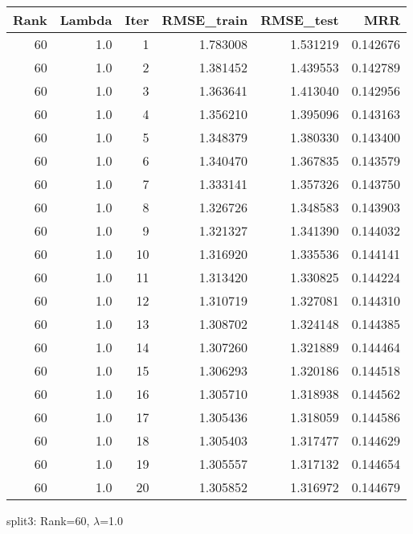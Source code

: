 \begin{tabular}{rrrrrr}
\toprule
 Rank &  Lambda &  Iter &  RMSE\_train &  RMSE\_test &       MRR \\
\midrule
   60 &     1.0 &     1 &    1.783008 &   1.531219 &  0.142676 \\
   60 &     1.0 &     2 &    1.381452 &   1.439553 &  0.142789 \\
   60 &     1.0 &     3 &    1.363641 &   1.413040 &  0.142956 \\
   60 &     1.0 &     4 &    1.356210 &   1.395096 &  0.143163 \\
   60 &     1.0 &     5 &    1.348379 &   1.380330 &  0.143400 \\
   60 &     1.0 &     6 &    1.340470 &   1.367835 &  0.143579 \\
   60 &     1.0 &     7 &    1.333141 &   1.357326 &  0.143750 \\
   60 &     1.0 &     8 &    1.326726 &   1.348583 &  0.143903 \\
   60 &     1.0 &     9 &    1.321327 &   1.341390 &  0.144032 \\
   60 &     1.0 &    10 &    1.316920 &   1.335536 &  0.144141 \\
   60 &     1.0 &    11 &    1.313420 &   1.330825 &  0.144224 \\
   60 &     1.0 &    12 &    1.310719 &   1.327081 &  0.144310 \\
   60 &     1.0 &    13 &    1.308702 &   1.324148 &  0.144385 \\
   60 &     1.0 &    14 &    1.307260 &   1.321889 &  0.144464 \\
   60 &     1.0 &    15 &    1.306293 &   1.320186 &  0.144518 \\
   60 &     1.0 &    16 &    1.305710 &   1.318938 &  0.144562 \\
   60 &     1.0 &    17 &    1.305436 &   1.318059 &  0.144586 \\
   60 &     1.0 &    18 &    1.305403 &   1.317477 &  0.144629 \\
   60 &     1.0 &    19 &    1.305557 &   1.317132 &  0.144654 \\
   60 &     1.0 &    20 &    1.305852 &   1.316972 &  0.144679 \\
\bottomrule
\end{tabular}

\caption{split3: Rank=60, $\lambda$=1.0}
